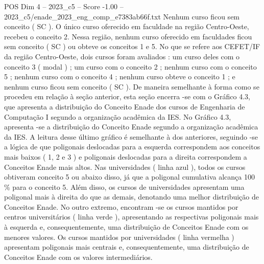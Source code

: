 \begin{textsample}{POS Dim 4 – 2023\_c5 – Score -1.00 – 2023\_c5/enade\_2023\_eng\_comp\_e7383ab66f.txt}
Nenhum curso ficou sem conceito ( SC ).
O único curso oferecido em faculdade na região Centro-Oeste, recebeu o conceito 2.
Nessa região, nenhum curso oferecido em faculdades ficou sem conceito ( SC ) ou obteve os conceitos 1 e 5.
No que se refere aos CEFET/IF da região Centro-Oeste, dois cursos foram avaliados : um curso deles com o conceito 3 ( modal ) ; um curso com o conceito 2 ; nenhum curso com o conceito 5 ; nenhum curso com o conceito 4 ; nenhum curso obteve o conceito 1 ; e nenhum curso ficou sem conceito ( SC ).
De maneira semelhante à forma como se procedeu em relação à seção anterior, esta seção encerra -se com o Gráfico 4.3, que apresenta a distribuição do Conceito Enade dos cursos de Engenharia de Computação I segundo a organização acadêmica da IES.
No Gráfico 4.3, apresenta -se a distribuição do Conceito Enade segundo a organização acadêmica da IES.
A leitura desse último gráfico é semelhante à dos anteriores, seguindo -se a lógica de que poligonais deslocadas para a esquerda correspondem aos conceitos mais baixos ( 1, 2 e 3 ) e poligonais deslocadas para a direita correspondem a Conceitos Enade mais altos.
Nas universidades ( linha azul ), todos os cursos obtiveram conceito 5 ou abaixo disso, já que a poligonal cumulativa alcança 100 \% para o conceito 5.
Além disso, os cursos de universidades apresentam uma poligonal mais à direita do que as demais, denotando uma melhor distribuição de Conceitos Enade.
No outro extremo, encontram -se os cursos mantidos por centros universitários ( linha verde ), apresentando as respectivas poligonais mais à esquerda e, consequentemente, uma distribuição de Conceitos Enade com os menores valores.
Os cursos mantidos por universidades ( linha vermelha ) apresentam poligonais mais centrais e, consequentemente, uma distribuição de Conceitos Enade com os valores intermediários.

\end{textsample}
